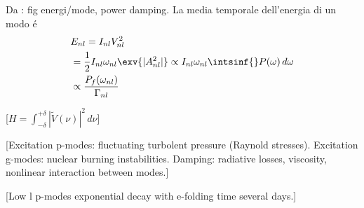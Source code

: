 \begin{refsection}
 Da \cite{libbrecht1988solar}: fig  energi/mode, power damping.
La media temporale dell'energia di un modo \'e
\begin{align}
&E_{nl}=I_{nl}V_{nl}^2\\
&=\frac{1}{2}I_{nl}\omega_{nl}\exv{|A_{nl}^2|}\propto I_{nl}\omega_{nl}\intsinf{}P(\omega)\,d\omega\\
&\propto\frac{P_f(\omega_{nl})}{\Gamma_{nl}}
\end{align}

[$H=\int_{-\delta}^{+\delta}|\tilde{V}(\nu)|^2\,d\nu$]

\begin{comment}%
[Si ipotizza che le oscillazioni siano eccitate in maniera stocastica dai moti convettivi: la larghezza delle frequenze risonanti \'e determinata dal tempo di smorzamento.]

[Extensive turbolent layers: stars lose all hint of vibrational instability]

[Not self excited: driven to observable amplitude by external process]

[Turbolent convection: source of pulsational energy, emit acustic radiation]

[Stable pulsation: spectrum as that of an ensemble of harmonic oscillator stocastically driven and damped]

[Power spectrum indipendent of l for $l<100$: low degree modes are not influenced by $k_h$. Vertical propagation: superficial layers (low l modes are generated in these strata)]


[Interaction with turbolent convection]

[Radiative transfer (as frequencies rise modes became more sensitive to rapid relaxation time in solar atmosphere)]

[La stabilit\'a dei modi g \'e determinata dalla stabilit\'a convettiva: se non sono presenti regioni di instabilit\'a convettiva i modi g sono stabili ($g_+$), se esistono zone convettivamente instabili esistono anche modi g instabili ($g_{\,-}$).]
\end{comment}

[Excitation p-modes: fluctuating turbolent pressure (Raynold stresses). Excitation g-modes: nuclear burning instabilities. Damping: radiative losses, viscosity, nonlinear interaction between modes.]

[Low l p-modes exponential decay with e-folding time several days.]




\end{refsection}
